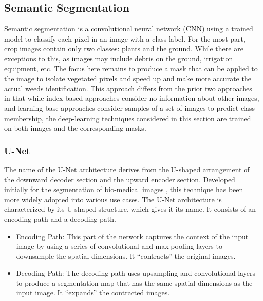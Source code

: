 \documentclass[letterpaper]{report}
\begin{document}
{{%
%
}

\subsection{Semantic Segmentation}
Semantic segmentation is a convolutional neural network (\gls{CNN}) using a trained model to classify each pixel in an image with a class label.  For the most part, crop images contain only two classes: plants and the ground. While there are exceptions to this,  as images may include debris on the ground, irrigation equipment, etc.  The focus here remains to produce a mask that can be applied to the image to isolate vegetated pixels and speed up and make more accurate the actual weeds identification. This approach differs from the prior two approaches in that while index-based approaches consider no information about other images, and learning base approaches consider samples of a set of images to predict class membership, the deep-learning techniques considered in this section are trained on both images and the corresponding masks.

\subsubsection{U-Net}
The name of the U-Net architecture derives from the U-shaped arrangement of the downward decoder section and the upward encoder section. Developed initially for the segmentation of bio-medical images \parencite{Ronneberger2015-ye}, this technique has been more widely adopted into various use cases. The U-Net architecture is characterized by its U-shaped structure, which gives it its name. It consists of an encoding path and a decoding path.
\begin{itemize}
	\item{Encoding Path: This part of the network captures the context of the input image by using a series of convolutional and max-pooling layers to downsample the spatial dimensions. It “contracts” the original images.}
	\item{Decoding Path: The decoding path uses upsampling and convolutional layers to produce a segmentation map that has the same spatial dimensions as the input image. It “expands” the contracted images.}
\end{itemize}

}
\end{document}

